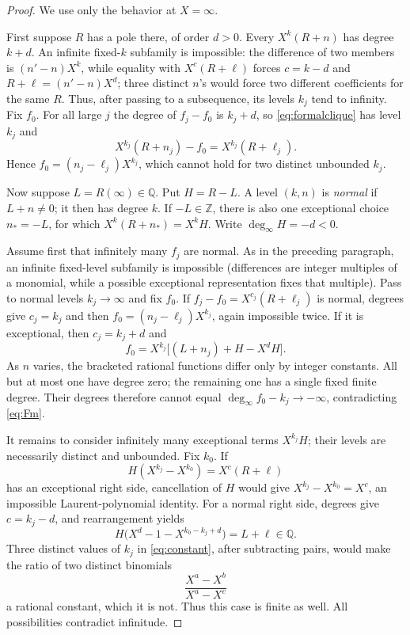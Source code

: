 \documentclass[11pt]{article}
\newcommand{\Z}{\mathbb Z}
\newcommand{\Q}{\mathbb Q}
\begin{document}
\begin{proof}
We use only the behavior at $X=\infty$.

First suppose $R$ has a pole there, of order $d>0$.  Every
$X^k(R+n)$ has degree $k+d$.  An infinite fixed-$k$ subfamily is
impossible: the difference of two members is $(n'-n)X^k$, while equality
with $X^c(R+\ell)$ forces $c=k-d$ and
$R+\ell=(n'-n)X^d$; three distinct $n$'s would force two different
coefficients for the same $R$.  Thus, after passing to a subsequence, its
levels $k_j$ tend to infinity.  Fix $f_0$.  For all large $j$ the degree of
$f_j-f_0$ is $k_j+d$, so \eqref{eq:formalclique} has level $k_j$ and
\[
 X^{k_j}(R+n_j)-f_0=X^{k_j}(R+\ell_j).
\]
Hence $f_0=(n_j-\ell_j)X^{k_j}$, which cannot hold for two distinct
unbounded $k_j$.

Now suppose $L=R(\infty)\in\Q$.  Put $H=R-L$.  A level $(k,n)$ is
\emph{normal} if $L+n\ne0$; it then has degree $k$.  If $-L\in\Z$, there
is also one exceptional choice $n_*=-L$, for which
$X^k(R+n_*)=X^kH$.  Write $\deg_\infty H=-d<0$.

Assume first that infinitely many $f_j$ are normal.  As in the preceding
paragraph, an infinite fixed-level subfamily is impossible (differences are
integer multiples of a monomial, while a possible exceptional
representation fixes that multiple).  Pass to normal levels $k_j\to\infty$
and fix $f_0$.  If $f_j-f_0=X^{c_j}(R+\ell_j)$ is normal, degrees give
$c_j=k_j$ and then $f_0=(n_j-\ell_j)X^{k_j}$, again impossible twice.  If it
is exceptional, then $c_j=k_j+d$ and
\begin{equation}\label{eq:Fm}
 f_0=X^{k_j}\bigl[(L+n_j)+H-X^dH\bigr].
\end{equation}
As $n$ varies, the bracketed rational functions differ only by integer
constants.  All but at most one have degree zero; the remaining one has a
single fixed finite degree.  Their degrees therefore cannot equal
$\deg_\infty f_0-k_j\to-\infty$, contradicting \eqref{eq:Fm}.

It remains to consider infinitely many exceptional terms $X^{k_j}H$;
their levels are necessarily distinct and unbounded.  Fix $k_0$.  If
\[
 H(X^{k_j}-X^{k_0})=X^c(R+\ell)
\]
has an exceptional right side, cancellation of $H$ would give
$X^{k_j}-X^{k_0}=X^c$, an impossible Laurent-polynomial identity.  For a
normal right side, degrees give $c=k_j-d$, and rearrangement yields
\begin{equation}\label{eq:constant}
 H\bigl(X^d-1-X^{k_0-k_j+d}\bigr)=L+\ell\in\Q.
\end{equation}
Three distinct values of $k_j$ in \eqref{eq:constant}, after subtracting
pairs, would make the ratio of two distinct binomials
\[
 \frac{X^a-X^b}{X^a-X^c}
\]
a rational constant, which it is not.  Thus this case is finite as well.
All possibilities contradict infinitude.
\end{proof}
\end{document}
